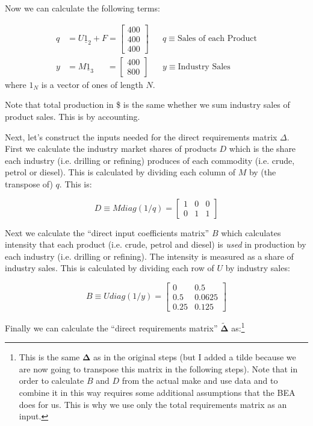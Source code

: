 \documentclass[12pt,english]{article}
\newcommand{\hlight}[1]{\textcolor{org}{#1}}
\begin{document}
\hlight{Now we can calculate the following terms:}

\hlight{\begin{align*}
	q&= U\underline{1}_2 + F = \begin{bmatrix}400\\400\\400  \end{bmatrix} &&q\equiv \text{Sales of each Product}\\
	y&= M\underline{1}_3 \quad\;\; = \begin{bmatrix}400\\800
	\end{bmatrix} && y\equiv \text{Industry Sales}
\end{align*}}
\hlight{where $1_N$ is a vector of ones of length $N$.}

\hlight{Note that total production in \$ is the same whether we sum industry sales of product sales. This is by accounting. }

\hlight{Next, let's construct the inputs needed for the direct requirements matrix $\Delta$. First we calculate the industry market shares of products $D$ which is the share each industry (i.e. drilling or refining) produces of each commodity (i.e. crude, petrol or diesel). This is calculated by dividing each column of $M$ by (the transpose of) $q$. This is:}

\hlight{$$
	D\equiv M diag(1/q) = \begin{bmatrix}
		1 & 0 & 0\\
		0 & 1 & 1
	\end{bmatrix}
$$ }

\hlight{Next we calculate the ``direct input coefficients matrix'' $B$ which calculates intensity that each product (i.e. crude, petrol and diesel) is \emph{used} in production by each industry (i.e. drilling or refining). The intensity is measured as a share of industry sales. This is calculated by dividing each row of $U$ by industry sales:}

\hlight{$$
	B\equiv U diag(1/y) = \begin{bmatrix}
		0 & 0.5\\
		0.5 & 0.0625\\
		0.25 & 0.125
	\end{bmatrix}
$$ }

\hlight{Finally we can calculate the ``direct requirements matrix'' $\tilde{\mathbold{\Delta}}$ as:\footnote{\hlight{This is the same $\mathbold{\Delta}$ as in the original steps (but I added a tilde because we are now going to transpose this matrix in the following steps). Note that in order to calculate $B$ and $D$ from the actual make and use data and to combine it in this way requires some additional assumptions that the BEA does for us. This is why we use only the total requirements matrix as an input.}}}
\end{document}
